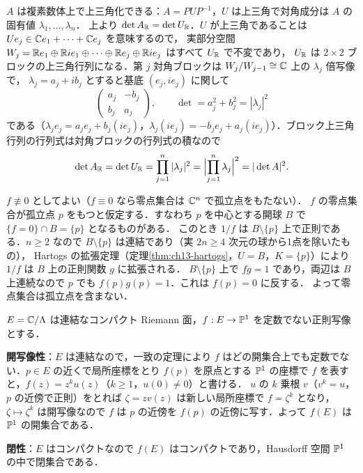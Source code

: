 $A$ は複素数体上で上三角化できる：$A=PUP^{-1}$，$U$ は上三角で対角成分は $A$ の固有値 $\lambda_1,\dots,\lambda_n$．
上より $\det A_{\mathbb{R}}=\det U_{\mathbb{R}}$．$U$ が上三角であることは $Ue_j\in\mathbb{C} e_1+\cdots+\mathbb{C} e_j$ を意味するので，
実部分空間 $W_j=\mathbb{R} e_1\oplus\mathbb{R} ie_1\oplus\cdots\oplus\mathbb{R} e_j\oplus\mathbb{R} ie_j$ はすべて $U_{\mathbb{R}}$ で不変であり，
$U_{\mathbb{R}}$ は $2\times2$ ブロックの上三角行列になる．第 $j$ 対角ブロックは $W_j/W_{j-1}\cong\mathbb{C}$ 上の $\lambda_j$ 倍写像で，
$\lambda_j=a_j+ib_j$ とすると基底 $(e_j,ie_j)$ に関して
\begin{equation*}
  \begin{pmatrix} a_j & -b_j\\ b_j & a_j\end{pmatrix},\qquad \det = a_j^2+b_j^2 = |\lambda_j|^2
\end{equation*}
である（$\lambda_j e_j = a_je_j + b_j(ie_j)$，$\lambda_j(ie_j) = -b_je_j + a_j(ie_j)$）．ブロック上三角行列の行列式は対角ブロックの行列式の積なので
\begin{equation*}
  \det A_{\mathbb{R}} = \det U_{\mathbb{R}} = \prod_{j=1}^n|\lambda_j|^2 = \Bigl|\prod_{j=1}^n\lambda_j\Bigr|^2 = |\det A|^2 .
\end{equation*}

$f\not\equiv0$ としてよい（$f\equiv0$ なら零点集合は $\mathbb{C}^n$ で孤立点をもたない）．
$f$ の零点集合が孤立点 $p$ をもつと仮定する．すなわち $p$ を中心とする開球 $B$ で $\{f=0\}\cap B=\{p\}$ となるものがある．
このとき $1/f$ は $B\setminus\{p\}$ 上で正則である．$n\geq2$ なので $B\setminus\{p\}$ は連結であり（実 $2n\geq4$ 次元の球から1点を除いたもの），
Hartogs の拡張定理（定理\ref{thm:ch13-hartogs}，$U=B$，$K=\{p\}$）により $1/f$ は $B$ 上の正則関数 $g$ に拡張される．
$B\setminus\{p\}$ 上で $f g=1$ であり，両辺は $B$ 上連続なので $p$ でも $f(p)g(p)=1$．これは $f(p)=0$ に反する．
よって零点集合は孤立点を含まない．

$E=\mathbb{C}/\Lambda$ は連結なコンパクト Riemann 面，$f:E\to\mathbb{P}^1$ を定数でない正則写像とする．

\textbf{開写像性}：$E$ は連結なので，一致の定理により $f$ はどの開集合上でも定数でない．$p\in E$ の近くで局所座標をとり
$f(p)$ を原点とする $\mathbb{P}^1$ の座標で $f$ を表すと，$f(z)=z^k u(z)$（$k\geq1$，$u(0)\neq0$）と書ける．
$u$ の $k$ 乗根 $v$（$v^k=u$，$p$ の近傍で正則）をとれば $\zeta=zv(z)$ は新しい局所座標で $f=\zeta^k$ となり，
$\zeta\mapsto\zeta^k$ は開写像なので $f$ は $p$ の近傍を $f(p)$ の近傍に写す．よって $f(E)$ は $\mathbb{P}^1$ の開集合である．

\textbf{閉性}：$E$ はコンパクトなので $f(E)$ はコンパクトであり，Hausdorff 空間 $\mathbb{P}^1$ の中で閉集合である．

